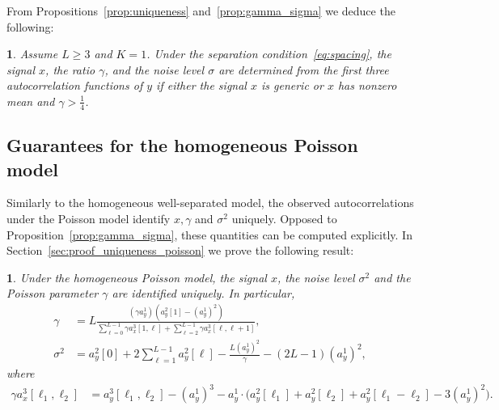 \documentclass[12pt]{article}
\newcommand{\1}{\mathbf{1}}
\newcommand{\TODO}[1]{{\color{red}{[#1]}}}
\theoremstyle{plain}
\theoremstyle{definition}
\theoremstyle{remark}
\theoremstyle{plain}
\theoremstyle{remark}
\theoremstyle{plain}
\newtheorem{corollary}[thm]{\protect\corollaryname}
\theoremstyle{plain}
\theoremstyle{plain}
\newtheorem{proposition}[thm]{\protect\propositionname}
\providecommand{\corollaryname}{Corollary}
\providecommand{\propositionname}{Proposition}
\numberwithin{equation}{section}
\begin{document}
From Propositions~\ref{prop:uniqueness} and~\ref{prop:gamma_sigma} we   deduce the following:
\begin{corollary}
	Assume $L \geq 3$ and $K=1$.
	Under the separation condition~\eqref{eq:spacing}, the signal $x$, the ratio $\gamma$, and the noise level $\sigma$ are determined from the first three autocorrelation functions of $y$ if either the signal $x$ is generic or $x$ has nonzero mean  and $\gamma > \frac{1}{4}$.
\end{corollary}
%


\subsection{Guarantees for the homogeneous Poisson model} \label{sec:theory_homogeneous_poisson}

Similarly to the homogeneous well-separated model, the observed autocorrelations under the Poisson model identify $x,\gamma$ and $\sigma^2$ uniquely.
Opposed to Proposition~\ref{prop:gamma_sigma}, these quantities can be computed explicitly. 
In Section~\ref{sec:proof_uniqueness_poisson} we prove the following result:
%
\begin{proposition} \label{prop:uniqueness_poisson}
Under the homogeneous Poisson model, the signal $x$, the noise level $\sigma^2$ and the Poisson parameter $\gamma$ are identified uniquely. 
In particular, \TODO{Shouldn't it be $L^2$ for $\gamma$?}
	\begin{align}
\gamma &= L \frac{(\gamma a_y^1) (a_y^2[1] - (a_y^1)^2)}
{\sum_{\ell=0}^{L-1} \gamma a_x^3[1,\ell] 
	+ \sum_{\ell=2}^{L-1} \gamma a_x^3[\ell,\ell+1]}, \\
\sigma^2 &= a_y^2[0] + 2\sum_{\ell = 1}^{L-1}a_y^2[\ell]-\frac{L (a^1_y)^2}{\gamma}
- (2 L - 1) (a_y^1)^2,
\end{align}
where 
\begin{align}
\gamma a_x^3[\ell_1,\ell_2]
&= a_y^3[\ell_1,\ell_2] - (a_y^1)^3
- a_y^1 \cdot \big(a_y^2[\ell_1]  
+ a_y^2[\ell_2] + a_y^2[\ell_1-\ell_2]- 3(a_y^1)^2 \big).
\end{align}

\end{proposition}
\end{document}
